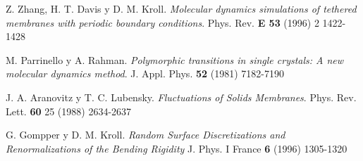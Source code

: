 \begin{thebibliography}{99}
 Z. Zhang, H. T. Davis y D. M. Kroll.
\textit{Molecular dynamics simulations of tethered membranes with periodic
  boundary conditions}.
 Phys. Rev. \textbf{E 53} (1996) 2 1422-1428

 M. Parrinello y A. Rahman.
\textit{Polymorphic transitions in single crystals: A new molecular dynamics
  method}.
J. Appl. Phys. \textbf{52} (1981) 7182-7190  

 J. A. Aranovitz y T. C. Lubensky. 
\textit{Fluctuations of Solids Membranes}.
Phys. Rev. Lett. \textbf{60} 25 (1988) 2634-2637

G. Gompper y D. M. Kroll.
\textit{Random Surface Discretizations and Renormalizations of the Bending
  Rigidity}
J. Phys. I France \textbf{6} (1996) 1305-1320

\end{thebibliography}


